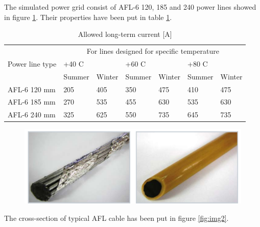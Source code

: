 \documentclass[a4paper]{article}
\begin{document}
The simulated power grid consist of AFL-6 120, 185  and 240 power lines showed in figure \ref{fig:img1}. Their properties have been put in table \ref{tab:aflProperties}.

\begin{table}[!h]
\centering
\caption{Allowed long-term current {[}A{]}}
\label{tab:aflProperties}
\begin{tabular}{|l|l|l|l|l|l|l|}
\hline
\multicolumn{1}{|c|}{\multirow{3}{*}{Power line type}} & \multicolumn{6}{c|}{For lines designed for specific temperature}                     \\ \cline{2-7} 
\multicolumn{1}{|c|}{}                                & \multicolumn{2}{l|}{+40 C} & \multicolumn{2}{l|}{+60 C} & \multicolumn{2}{l|}{+80 C} \\ \cline{2-7} 
\multicolumn{1}{|c|}{}                                & Summer       & Winter      & Summer       & Winter      & Summer       & Winter      \\ \hline
AFL-6 120 mm                                          & 205          & 405         & 350          & 475         & 410          & 475         \\ \hline
AFL-6 185 mm                                          & 270          & 535         & 455          & 630         & 535          & 630         \\ \hline
AFL-6 240 mm                                          & 325          & 625         & 550          & 735         & 645          & 735         \\ \hline
\end{tabular}
\end{table}

\begin{figure}[h]
\centering
\includegraphics[scale=0.45]{schemas/img1.png}
\caption{\label{fig:img1}}
\end{figure}

\clearpage

The cross-section of typical AFL cable has been put in figure \ref{fig:img2}.
\end{document}

